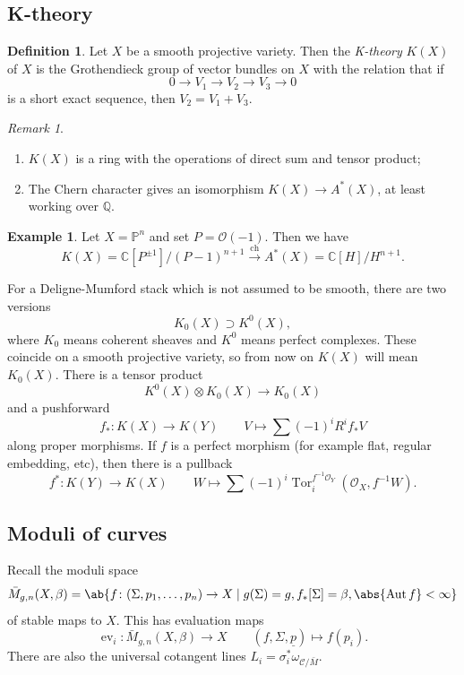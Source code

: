 \documentclass{amsart}
\theoremstyle{definition}
\newtheorem{defn}[thm]{Definition}
\newtheorem{exm}[thm]{Example}
\theoremstyle{remark}
\newtheorem{rmk}[thm]{Remark}
\theoremstyle{plain}
\theoremstyle{definition}
\theoremstyle{remark}
\newcommand{\C}{\mathbb{C}}
\newcommand{\Q}{\mathbb{Q}}
\renewcommand{\P}{\mathbb{P}}
\newcommand{\mc}[1]{\mathcal{#1}}
\newcommand{\on}[1]{\operatorname{#1}}
\newcommand{\ul}[1]{\underline{#1}}
\newcommand{\1}{\mathbf{1}}
\newcommand{\2}{\mathbf{2}}
\newcommand{\3}{\mathbf{3}}
\DeclareMathOperator{\Aut}{Aut}
\DeclareMathOperator{\ev}{ev}
\begin{document}
\subsection{K-theory}%
\label{sub:K-theory}

\begin{defn}
    Let \(X\) be a smooth projective variety. Then the \textit{K-theory} \(K(X)\) of \(X\) is the Grothendieck group of vector bundles on \(X\) with the relation that if
    \[ 0 \to V_1 \to V_2 \to V_3 \to 0 \]
    is a short exact sequence, then \(V_2 = V_1 + V_3\).
\end{defn}

\begin{rmk}\leavevmode
    \begin{enumerate}
        \item \(K(X)\) is a ring with the operations of direct sum and tensor product;
        \item The Chern character gives an isomorphism \(K(X) \to A^*(X)\), at least working over \(\Q\).
    \end{enumerate}
\end{rmk}

\begin{exm}
    Let \(X = \P^n\) and set \(P = \mc{O}(-1)\). Then we have
    \[ K(X) = \C[P^{\pm 1}]/(P-1)^{n+1} \xrightarrow{\on{ch}} A^*(X) = \C[H]/H^{n+1}. \]
\end{exm}

For a Deligne-Mumford stack which is not assumed to be smooth, there are two versions
\[ K_0(X) \supset K^0(X), \]
where \(K_0\) means coherent sheaves and \(K^0\) means perfect complexes. These coincide on a smooth projective variety, so from now on \(K(X)\) will mean \(K_0(X)\). There is a tensor product
\[ K^0(X) \otimes K_0(X) \to K_0(X) \]
and a pushforward
\[ f_* \colon K(X) \to K(Y) \qquad V \mapsto \sum (-1)^i R^i f_* V \]
along proper morphisms. If \(f\) is a perfect morphism (for example flat, regular embedding, etc), then there is a pullback
\[ f^* \colon K(Y) \to K(X) \qquad W \mapsto \sum (-1)^i \on{Tor}_i^{f^{-1} \mc{O}_Y} (\mc{O}_X, f^{-1} W). \]

\subsection{Moduli of curves}%
\label{sub:Moduli of curves}

Recall the moduli space
\[ \bar{M}_{g,n}(X, \beta) = \ab\{ f \colon (\Sigma, p_1, \ldots, p_n) \to X \mid g(\Sigma) = g, f_*[\Sigma] = \beta, \abs{\Aut f} < \infty \} \]
of stable maps to \(X\). This has evaluation maps
\[ \ev_i \colon \bar{M}_{g,n}(X, \beta) \to X \qquad (f, \Sigma, \ul{p}) \mapsto f(p_i). \]
There are also the universal cotangent lines \(L_i = \sigma_i^* \omega_{ \mc{C}/\bar{M} }\).
\end{document}
